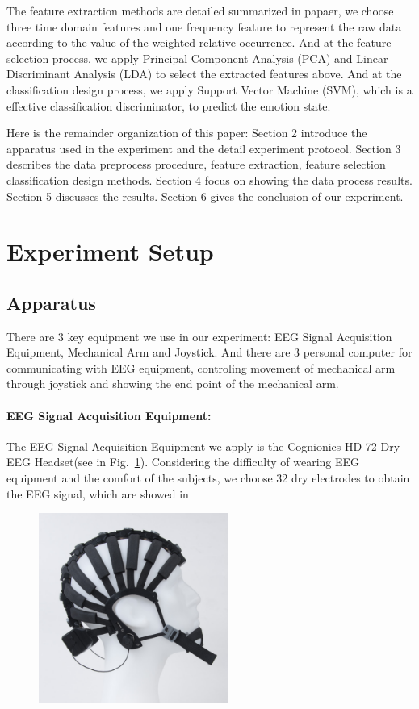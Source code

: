 \documentclass[runningheads,a4paper]{llncs}
\begin{document}
The feature extraction methods are detailed summarized in papaer\cite{Feature}, we choose
three time domain features and one frequency feature to represent the raw data according
to the value of the weighted relative occurrence. And at the feature selection process,
we apply Principal Component Analysis (PCA) and Linear Discriminant Analysis (LDA) to
select the extracted features above. And at the classification design process, we apply
Support Vector Machine (SVM), which is a effective classification discriminator,
to predict the emotion state.

Here is the remainder organization of this paper: Section 2 introduce the
apparatus used in the experiment and the detail experiment protocol. Section 3
describes the data preprocess procedure, feature extraction, feature selection
classification design methods. Section 4 focus on showing the data process
results. Section 5 discusses the results. Section 6 gives the conclusion of
our experiment.

\section{Experiment Setup}
\subsection{Apparatus}
There are 3 key equipment we use in our experiment: EEG Signal Acquisition Equipment,
Mechanical Arm and Joystick. And there are 3 personal computer for communicating
with EEG equipment, controling movement of mechanical arm through joystick and
showing the end point of the mechanical arm.
\paragraph{EEG Signal Acquisition Equipment:}
The EEG Signal Acquisition Equipment we apply is the Cognionics HD-72 Dry EEG
Headset(see in Fig.~\ref{fig:EEGequipment}).
Considering the difficulty of wearing EEG equipment and the comfort of the subjects,
we choose 32 dry electrodes to obtain the EEG signal, which are showed in


\begin{figure}
\centering
\includegraphics[height=6.2cm]{images/1}
\caption{}
\label{fig:EEGequipment}
\end{figure}
\end{document}
